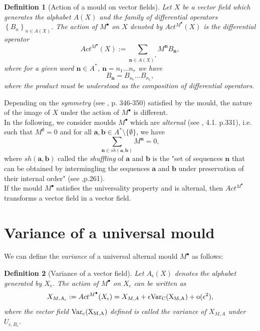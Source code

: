\documentclass[english,11pt]{amsart}
\newtheorem{definition}{Definition}
\def\nn{\mathbf{n}}
\def\aa{\mathbf{a}}
\def\bb{\mathbf{b}}
\def\var{\rm Var}
\def\di{\displaystyle}
\def\nn{\mathbf{n}}
\begin{document}
\begin{definition}[Action of a mould on vector fields]
Let $X$ be a vector field which generates the alphabet $A(X)$ and the family of differential operators $\left \{ B_n \right \}_{n\in A(X)}$. The action of $M^{\bullet}$ on $X$ denoted by $Act^{M^{\bullet}} (X)$ is the differential operator 
\begin{equation}
    Act^{M^{\bullet}} (X):=\di\sum_{\nn \in A(X)^*} M^{\nn } B_{\nn} ,
\end{equation}
where for a given word $\nn \in A^*$, $\nn =n_1 \dots n_r$ we have 
\begin{equation}
    B_{\nn} =B_{n_r} \dots B_{n_1} ,
\end{equation}
where the product must be understood as the composition of differential operators.
\end{definition}

Depending on the {\it symmetry} (see \cite{cr2}, p. 346-350) satisfied by the mould, the nature of the image of $X$ under the action of $M^{\bullet}$ is different.\\

In the following, we consider moulds $M^{\bullet}$ which are {\it alternal} (see \cite{cr2}, 4.1. p.331), i.e. such that $M^{\emptyset} =0$ and for all $\aa, \bb \in A^*\setminus \{\emptyset \}$, we have 
\begin{equation}
    \di\sum_{\nn \in sh (\aa ,\bb ) } M^{\nn} =0 ,
\end{equation}
where $sh (\aa ,\bb )$ called the {\it shuffling} of $\aa$ and $\bb$ is the "set of sequences $\nn$ that can be obtained by intermingling the sequences $\aa$ and $\bb$ under preservation of their internal order" (see \cite{ev},p.261).\\

If the mould $M^{\bullet}$ satisfies the universality property and is alternal, then $Act^{M^{\bullet}}$ transforms a vector field in a vector field. 


\section{Variance of a universal mould}
\label{secvariance}

We can define the {\it variance} of a universal alternal mould $M^{\bullet}$ as follows:

\begin{definition}[Variance of a vector field]
Let $A_{\epsilon} (X)$ denotes the alphabet generated by $X_{\epsilon}$. The action of $M^{\bullet}$ on $X_{\epsilon}$ can be written as 
\begin{equation}
   X_{M,A_{\epsilon}} :=Act^{M^{\bullet}} (X_{\epsilon} ) =X_{M,A} +\epsilon \var_C (X_{M,A}) +o(\epsilon ^2 ) ,
\end{equation}
where the vector field $\var_c (X_{M,A} )$ defined is called the variance of $X_{M,A}$ under $U_{\epsilon ,B_c}$. 
\end{definition}
\end{document}
